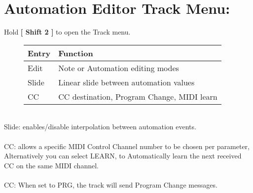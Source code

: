 \section{Automation Editor Track Menu:}
Hold \textbf{[ Shift 2 ]} to open the Track menu.
\begin{figure}[hb]
    \begin{tabular}{|l|l|}
    \hline
    \rowcolor[HTML]{C0C0C0}
    Entry        & Function \\ \hline
    Edit         & Note or Automation editing modes\\ \hline
    Slide      & Linear slide between automation values \\ \hline
    CC         & CC destination, Program Change,  MIDI learn \\ \hline
    \end{tabular}
\end{figure}
\\
Slide: enables/disable interpolation between automation events.\\\\
CC: allows a specific MIDI Control Channel number to be chosen per parameter, Alternatively you can select LEARN, to Automatically learn the next received CC on the same MIDI channel.\\\\
CC: When set to PRG, the track will send Program Change messages.


